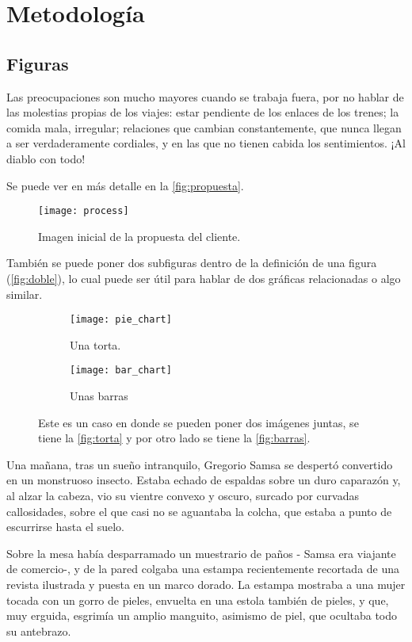 \section{Metodología}
\subsection{Figuras}
Las preocupaciones son mucho mayores cuando se trabaja fuera, por no hablar de las molestias propias de los viajes: estar pendiente de los enlaces de los trenes; la comida mala, irregular; relaciones que cambian constantemente, que nunca llegan a ser verdaderamente cordiales, y en las que no tienen cabida los sentimientos. ¡Al diablo con todo!

Se puede ver en más detalle en la \autoref{fig:propuesta}.

\begin{figure}[h]
	\centering
	\texttt{[image: process]}
	\caption{Imagen inicial de la propuesta del cliente.}
	\label{fig:propuesta}
\end{figure}

También se puede poner dos subfiguras dentro de la definición de una figura (\autoref{fig:doble}), lo cual puede ser útil para hablar de dos gráficas relacionadas o algo similar. 

\begin{figure}[h!]
	\centering
	\begin{subfigure}{.45\textwidth}
		\centering
		\texttt{[image: pie\_chart]}%
		\caption{Una torta.}
		\label{fig:torta}
	\end{subfigure} 
	\hfil
	\begin{subfigure}{.45\textwidth}
		\centering
		\texttt{[image: bar\_chart]}%
		\caption{Unas barras}
		\label{fig:barras}
	\end{subfigure}
	\caption{Este es un caso en donde se pueden poner dos imágenes juntas, se tiene la \autoref{fig:torta} y por otro lado se tiene la \autoref{fig:barras}.}
	\label{fig:doble}
\end{figure}

Una mañana, tras un sueño intranquilo, Gregorio Samsa se despertó convertido en un monstruoso insecto. Estaba echado de espaldas sobre un duro caparazón y, al alzar la cabeza, vio su vientre convexo y oscuro, surcado por curvadas callosidades, sobre el que casi no se aguantaba la colcha, que estaba a punto de escurrirse hasta el suelo.

Sobre la mesa había desparramado un muestrario de paños - Samsa era viajante de comercio-, y de la pared colgaba una estampa recientemente recortada de una revista ilustrada y puesta en un marco dorado. La estampa mostraba a una mujer tocada con un gorro de pieles, envuelta en una estola también de pieles, y que, muy erguida, esgrimía un amplio manguito, asimismo de piel, que ocultaba todo su antebrazo.

